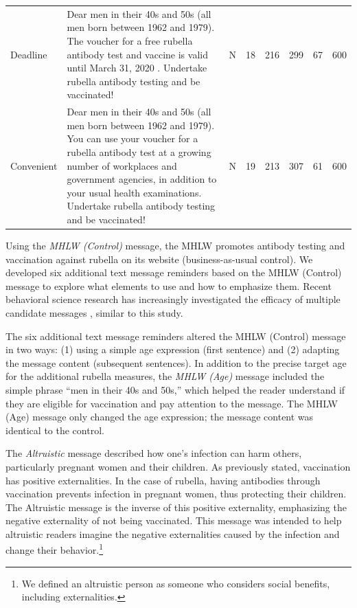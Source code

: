 \documentclass[
      12pt,
    a4paper
]{article}
\begin{document}
\begin{table}
\begin{tabular}[t]{l>{\raggedright\arraybackslash}p{20em}cccccc}
\addlinespace
Deadline & Dear men in their 40s and 50s (all men born between 1962 and 1979). The voucher for a free rubella antibody test and vaccine is valid until March 31, 2020 . Undertake rubella antibody testing and be vaccinated! & N & 18 & 216 & 299 & 67 & 600\\
\addlinespace
Convenient & Dear men in their 40s and 50s (all men born between 1962 and 1979). You can use your voucher for a rubella antibody test at a growing number of workplaces and government agencies, in addition to your usual health examinations. Undertake rubella antibody testing and be vaccinated! & N & 19 & 213 & 307 & 61 & 600\\
\bottomrule
\end{tabular}
\end{table}

Using the \emph{MHLW (Control)} message, the MHLW promotes antibody testing and vaccination against rubella on its website (business-as-usual control). We developed six additional text message reminders based on the MHLW (Control) message to explore what elements to use and how to emphasize them. Recent behavioral science research has increasingly investigated the efficacy of multiple candidate messages \citep[e.g.,][]{Dai2021, Milkman2021}, similar to this study.

The six additional text message reminders altered the MHLW (Control) message in two ways: (1) using a simple age expression (first sentence) and (2) adapting the message content (subsequent sentences). In addition to the precise target age for the additional rubella measures, the \emph{MHLW (Age)} message included the simple phrase ``men in their 40s and 50s,'' which helped the reader understand if they are eligible for vaccination and pay attention to the message. The MHLW (Age) message only changed the age expression; the message content was identical to the control.

The \emph{Altruistic} message described how one's infection can harm others, particularly pregnant women and their children. As previously stated, vaccination has positive externalities. In the case of rubella, having antibodies through vaccination prevents infection in pregnant women, thus protecting their children. The Altruistic message is the inverse of this positive externality, emphasizing the negative externality of not being vaccinated. This message was intended to help altruistic readers imagine the negative externalities caused by the infection and change their behavior.\footnote{We defined an altruistic person as someone who considers social benefits, including externalities.}
\end{document}
